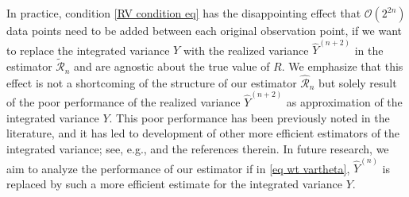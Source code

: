 \documentclass[12pt,reqno]{article}
\def\wh{\widehat}
\def\wt{\widetilde}
\numberwithin{equation}{section}
\def\cR{{\mathscr R}}
\theoremstyle{definition}
\def\wt#1{\widetilde{#1}}
\def\wh{\widehat}
\def\wt{\widetilde}
\begin{document}
In practice, condition \eqref{RV condition eq} has the disappointing effect that $\mathcal{O}(2^{2n})$ data points need to be added between each original observation point, if we want to replace the integrated variance $Y$ with the realized variance $\wh Y^{(n+2)}$ in the estimator $\wt \cR_{n}$ and are agnostic about the true value of $R$. We emphasize that this effect is not a shortcoming of the structure of our estimator  $\wh\cR_n$  but solely result of the poor performance of the realized variance  $\wh Y^{(n+2)}$  as approximation of the integrated variance $Y$. This poor performance has been previously noted in the literature, and it has led to development of other more efficient estimators of the integrated variance; see, e.g., \cite{AitSahaliaJacod} and the references therein. In future research, we aim to analyze the performance of our estimator if in \eqref{eq wt vartheta}, $\wh Y^{(n)}$ is replaced by such a more efficient estimate for the integrated variance $Y$. 
\end{document}
